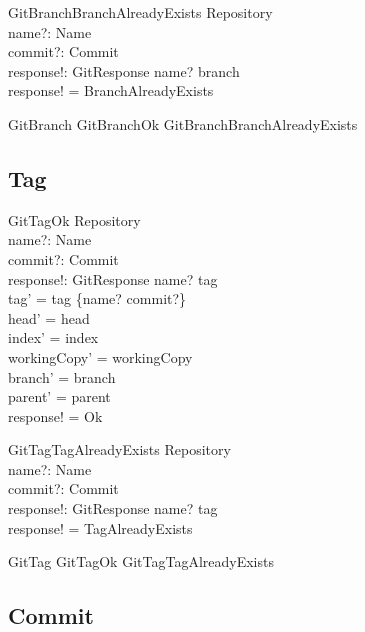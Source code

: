 \begin{schema}{GitBranchBranchAlreadyExists}
	\Xi Repository \\
	name?: Name \\
	commit?: Commit \\
	response!: GitResponse
\where
	name? \in \dom branch \\
  response! = BranchAlreadyExists
\end{schema}

\begin{zed}
	GitBranch  GitBranchOk \lor GitBranchBranchAlreadyExists
\end{zed}

\subsection{Tag}

\begin{schema}{GitTagOk}
	\Delta Repository \\
	name?: Name \\
	commit?: Commit \\
	response!: GitResponse
\where
	name? \notin \dom tag \\
	tag' = tag \cup \{name? \mapsto commit?\} \\
	head' = head \\
	index' = index \\
	workingCopy' = workingCopy \\
	branch' = branch \\
	parent' = parent \\
	response! = Ok
\end{schema}

\begin{schema}{GitTagTagAlreadyExists}
	\Xi Repository \\
	name?: Name \\
	commit?: Commit \\
	response!: GitResponse
\where
	name? \in \dom tag \\
  response! = TagAlreadyExists
\end{schema}

\begin{zed}
	GitTag  GitTagOk \lor GitTagTagAlreadyExists
\end{zed}

\subsection{Commit}

